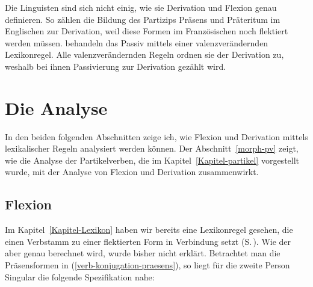 \noindent
Die Linguisten sind sich nicht einig, wie sie Derivation und Flexion genau definieren.
So zählen \citet*[--264]{SWB2003a} die Bildung des Partizips Präsens und Präteritum im Englischen
zur Derivation, weil diese Formen im Französischen noch flektiert werden müssen.
\citet*[]{SWB2003a} behandeln das Passiv mittels einer valenzverändernden Lexikonregel.
Alle valenzverändernden Regeln ordnen sie der Derivation zu, weshalb bei ihnen Passivierung
zur Derivation gezählt wird.

\section{Die Analyse}

In den beiden folgenden Abschnitten zeige ich, wie Flexion und Derivation mittels lexikalischer Regeln
analysiert werden können. Der Abschnitt~\ref{morph-pv} zeigt, wie die Analyse der Partikelverben, die
im Kapitel~\ref{Kapitel-partikel} vorgestellt wurde, mit der Analyse von Flexion und Derivation zusammenwirkt.

\subsection{Flexion}
\label{sec-morph-flex-anal}
\label{sec-inflection-hpsg}

Im Kapitel~\ref{Kapitel-Lexikon} haben wir bereits eine Lexikonregel gesehen, die einen Verbstamm zu einer
flektierten Form in Verbindung setzt (S.\,\pageref{passive-lr-mit-phon}). Wie der \phonw aber genau berechnet
wird, wurde bisher nicht erklärt. Betrachtet man die Präsensformen in (\ref{verb-konjugation-praesens}),
so liegt \zb für die zweite Person Singular die folgende Spezifikation
nahe:

